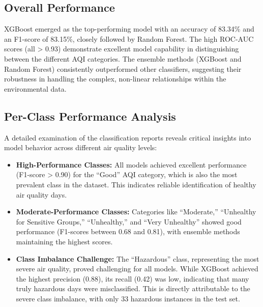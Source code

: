 \documentclass[a4paper,fleqn]{cas-dc}
\begin{document}
\subsection{Overall Performance}
XGBoost emerged as the top-performing model with an accuracy of 83.34\% and an F1-score of 83.15\%, closely followed by Random Forest. The high ROC-AUC scores (all > 0.93) demonstrate excellent model capability in distinguishing between the different AQI categories. The ensemble methods (XGBoost and Random Forest) consistently outperformed other classifiers, suggesting their robustness in handling the complex, non-linear relationships within the environmental data.

\subsection{Per-Class Performance Analysis}
A detailed examination of the classification reports reveals critical insights into model behavior across different air quality levels:
\begin{itemize}
    \item \textbf{High-Performance Classes:} All models achieved excellent performance (F1-score > 0.90) for the ``Good'' AQI category, which is also the most prevalent class in the dataset. This indicates reliable identification of healthy air quality days.
    \item \textbf{Moderate-Performance Classes:} Categories like ``Moderate,'' ``Unhealthy for Sensitive Groups,'' ``Unhealthy,'' and ``Very Unhealthy'' showed good performance (F1-scores between 0.68 and 0.81), with ensemble methods maintaining the highest scores.
    \item \textbf{Class Imbalance Challenge:} The ``Hazardous'' class, representing the most severe air quality, proved challenging for all models. While XGBoost achieved the highest precision (0.88), its recall (0.42) was low, indicating that many truly hazardous days were misclassified. This is directly attributable to the severe class imbalance, with only 33 hazardous instances in the test set.
\end{itemize}
\end{document}
